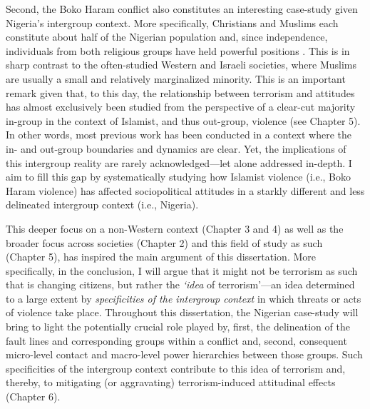 Second, the Boko Haram conflict also constitutes an interesting case-study given Nigeria's intergroup context. More specifically, Christians and Muslims each constitute about half of the Nigerian population \citep{NPC2013} and, since independence, individuals from both religious groups have held powerful positions \citep[such as those of military ruler and president;][]{Mustapha2009, Nnoli1996}. This is in sharp contrast to the often-studied Western and Israeli societies, where Muslims are usually a small and relatively marginalized minority. This is an important remark given that, to this day, the relationship between terrorism and attitudes has almost exclusively been studied from the perspective of a clear-cut majority in-group in the context of Islamist, and thus out-group, violence (see Chapter 5). In other words, most previous work has been conducted in a context where the in- and out-group boundaries and dynamics are clear. Yet, the implications of this intergroup reality are rarely acknowledged---let alone addressed in-depth. I aim to fill this gap by systematically studying how Islamist violence (i.e., Boko Haram violence) has affected sociopolitical attitudes in a starkly different and less delineated intergroup context (i.e., Nigeria).


This deeper focus on a non-Western context (Chapter 3 and 4) as well as the broader focus across societies (Chapter 2) and this field of study as such (Chapter 5), has inspired the main argument of this dissertation. More specifically, in the conclusion, I will argue that it might not be terrorism as such that is changing citizens, but rather the \textit{`idea} of terrorism'---an idea determined to a large extent by \textit{specificities of the intergroup context} in which threats or acts of violence take place. Throughout this dissertation, the Nigerian case-study will bring to light the potentially crucial role played by, first, the delineation of the fault lines and corresponding groups within a conflict and, second, consequent micro-level contact and macro-level power hierarchies between those groups. Such specificities of the intergroup context contribute to this idea of terrorism and, thereby, to mitigating (or aggravating) terrorism-induced attitudinal effects (Chapter 6). %


